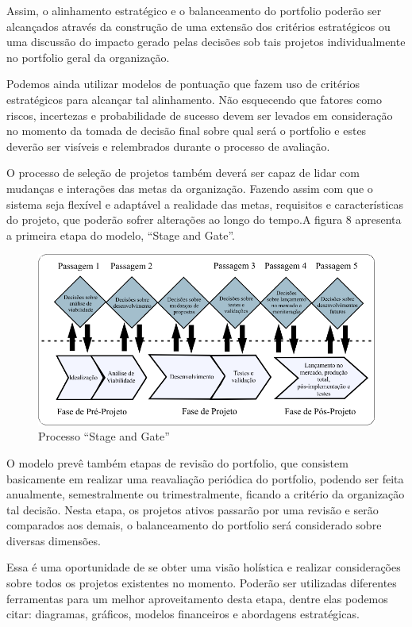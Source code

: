 \documentclass[12pt,a4paper,ruledheader,tocpage=prefix,floatnumber=continuous,pagestart=folhaderosto,font=times]{abnt}
\begin{document}
Assim, o alinhamento estratégico e o balanceamento do portfolio poderão ser alcançados através da construção de uma extensão dos critérios estratégicos ou
uma discussão do impacto gerado pelas decisões sob tais projetos individualmente no portfolio geral da organização. 

Podemos ainda utilizar modelos de pontuação que fazem uso de critérios estratégicos para alcançar tal alinhamento. Não esquecendo que fatores como riscos,
incertezas e probabilidade de sucesso devem ser levados em consideração no momento da tomada de decisão final sobre qual será o portfolio e estes 
deverão ser visíveis e relembrados durante o processo de avaliação.

O processo de seleção de projetos também deverá ser capaz de lidar com mudanças e interações das metas da organização. Fazendo assim com que o sistema seja 
flexível e adaptável a realidade das metas, requisitos e características do projeto, que poderão sofrer alterações ao longo do tempo.A figura 8
apresenta a primeira etapa do modelo, ``Stage and Gate''.

\begin{figure}[H]
\centering
\includegraphics[width=.9\textwidth]{img/fig8.png}
\caption{Processo ``Stage and Gate''}
\end{figure}

O modelo prevê também etapas de revisão do portfolio, que consistem basicamente em realizar uma reavaliação periódica do portfolio, podendo ser feita
anualmente, semestralmente ou trimestralmente, ficando a critério da organização tal decisão. Nesta etapa, os projetos ativos passarão por uma revisão
e serão comparados aos demais, o balanceamento do portfolio será considerado sobre diversas dimensões. 

Essa é uma oportunidade de se obter uma visão holística e realizar considerações sobre todos os projetos existentes no momento. Poderão ser utilizadas 
diferentes ferramentas para um melhor aproveitamento desta etapa, dentre elas podemos citar: diagramas, gráficos, modelos financeiros e abordagens 
estratégicas.
\end{document}
